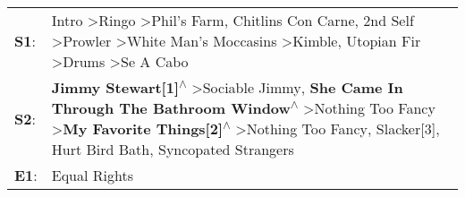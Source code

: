\begin{supertabular}{p{0.03\textwidth}p{0.92\textwidth}}
 \textbf{S1}:  &                     Intro\textsuperscript{} \textgreater \enspace Ringo\textsuperscript{} \textgreater \enspace Phil's Farm\textsuperscript{}, \enspace Chitlins Con Carne\textsuperscript{}, \enspace 2nd Self\textsuperscript{} \textgreater \enspace Prowler\textsuperscript{} \textgreater \enspace White Man's Moccasins\textsuperscript{} \textgreater \enspace Kimble\textsuperscript{}, \enspace Utopian Fir\textsuperscript{} \textgreater \enspace Drums\textsuperscript{} \textgreater \enspace Se A Cabo\textsuperscript{}  \enspace  \\
 \textbf{S2}:  &  \textbf{Jimmy Stewart[1]\textsuperscript{$\wedge$}} \textgreater \enspace Sociable Jimmy\textsuperscript{}, \enspace \textbf{She Came In Through The Bathroom Window\textsuperscript{$\wedge$}} \textgreater \enspace Nothing Too Fancy\textsuperscript{} \textgreater \enspace \textbf{My Favorite Things[2]\textsuperscript{$\wedge$}} \textgreater \enspace Nothing Too Fancy\textsuperscript{}, \enspace Slacker[3]\textsuperscript{}, \enspace Hurt Bird Bath\textsuperscript{}, \enspace Syncopated Strangers\textsuperscript{}  \enspace  \\
 \textbf{E1}:  &                                                                                                                                                                                                                                                                                                                                                                                                                                                                                                         Equal Rights\textsuperscript{}  \enspace  \\
\end{supertabular}
